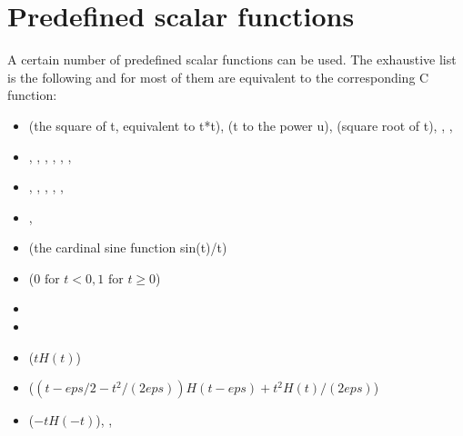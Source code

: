 \documentclass[a4paper,11pt,english]{sphinxmanual}
\begin{document}
\section{Predefined scalar functions}
\label{\detokenize{userdoc/gasm_high:predefined-scalar-functions}}
A certain number of predefined scalar functions can be used. The exhaustive list is the following and for most of them are equivalent to the corresponding C function:
\begin{itemize}
\item {} 
 (the square of t, equivalent to t*t),  (t to the power u),
 (square root of t), , , 

\item {} 
, , , , , , 

\item {} 
, , , , , 

\item {} 
, 

\item {} 
 (the cardinal sine function sin(t)/t)

\item {} 
 (\(0 \mbox{ for } t < 0, 1 \mbox{ for } t \ge 0\))

\item {} 

\item {} 

\item {} 
 (\(tH(t)\))

\item {} 
 (\((t-eps/2-t^2/(2eps))H(t-eps) + t^2H(t)/(2eps)\))

\item {} 
 (\(-tH(-t)\)), , 

\end{itemize}
\end{document}
